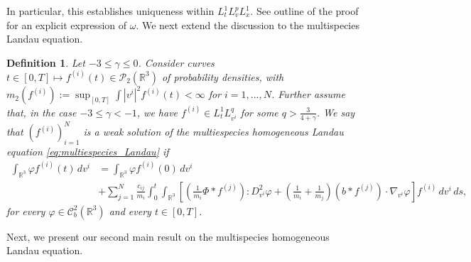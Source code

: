 \documentclass[10pt,oneside]{amsart}
\numberwithin{equation}{section}
\newtheorem{definition}{Definition}
\numberwithin{definition}{section}
\numberwithin{theorem}{section}
\numberwithin{lemma}{section}
\begin{document}
In particular, this establishes uniqueness within $L^1_t L^p_v L^1_x$. See outline of the proof for an explicit expression of $\omega$. We next extend the discussion to the multispecies Landau equation.
% 
\begin{definition}\label{defn:weak_sol_multi}
  Let $-3\leq \gamma \leq 0$. Consider curves ${t\in [0,T]\mapsto f^{(i)}(t)\in \mathcal P_2(\mathbb R^3)}$ of probability densities, with $m_2(f^{(i)}):=\sup_{[0,T]}\int |v^i|^2f^{(i)}(t)<\infty$ for $i=1,\ldots,N$. Further assume that, in the case $-3\leq \gamma <-1$,  we have $f^{(i)}\in L^1_tL^q_{v^i}$ for some $q>\frac{3}{4+\gamma}$. We say that $(f^{(i)})_{i=1}^N$ is a weak solution of the multiespecies homogeneous Landau equation \cref{eq:multiespecies_Landau} if
  \begin{align*}
    \int_{\mathbb{R}^{3}}\varphi f^{(i)}(t)\,dv^{i}& 
    = \int_{\mathbb{R}^{3}}\varphi f^{(i)}(0)\,dv^{i}\\
    &
    +\sum_{j=1}^{N}\frac{c_{ij}}{m_{i}}\int_{0}^{t}\int_{\mathbb{R}^{3}}\left[\left(\frac{1}{m_{i}}\Phi*f^{(j)}\right):D_{v^{i}}^{2}\varphi+\left(\frac{1}{m_{i}}
    +\frac{1}{m_{j}}\right)(b*f^{(j)})\cdot\nabla_{v^{i}}\varphi\right]f^{(i)}\,dv^{i}\,ds,
  \end{align*}
  for every $\varphi\in\mathcal{C}_{b}^{2}(\mathbb{R}^{3})$ and every $t\in [0,T]$.
\end{definition}
% 
Next, we present our second main result on the multispecies homogeneous Landau equation.
% 
\end{document}
